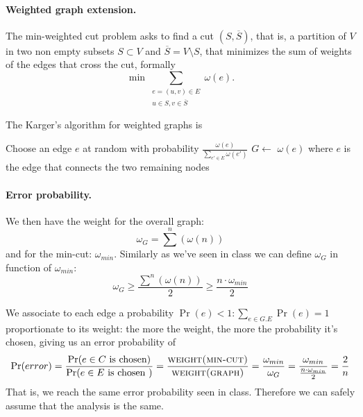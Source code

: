 \paragraph{Weighted graph extension.} The min-weighted cut problem asks to find a cut $(S, \overline{S})$, that is, a partition of $V$ in two non empty subsets $S \subset V$ and $\overline{S}=V \setminus S$, that minimizes the sum of weights of the edges that cross the cut, formally $$\min \sum_{\substack{e=(u,v)\in E \\ u \in S, v \in \overline{S}}} \omega(e).$$

The Karger's algorithm for weighted graphs is
\begin{algorithmic}[1]
	  \State Choose an edge $e$ at random with probability $\frac{\omega(e)}{\sum_{e' \in E} \omega(e')}$
	  \State $G \gets$ 
	\EndWhile
	\State \Return $\omega(e)$ where $e$ is the edge that connects the two remaining nodes
  \EndFunction
\end{algorithmic}

\paragraph{Error probability.} We then have the weight for the overall graph: 
\begin{equation*}
\omega_G = \sum^{n}\left( \omega(n) \right)
\end{equation*}
and for the min-cut: $\omega_{min}$.
Similarly as we've seen in class we can define $\omega_G$ in function of $\omega_{min}$:
\begin{equation*}
\omega_G \geq \frac{\sum^{n} \left( \omega(n) \right)}{2} \geq \frac{n \cdot \omega_{min}}{2}
\end{equation*}

We associate to each edge a probability $\Pr(e) < 1: \sum_{e \in G.E} \Pr(e)= 1$ proportionate to its weight: the more the weight, the more the probability it's chosen, giving us an error probability of
\begin{equation*}
\Pr(error) = \frac{\Pr(e \in C \text{ is chosen})}{\Pr(e \in E \text{ is chosen })} = \frac{\textsc{weight(min-cut)}}{\textsc{weight(graph)}} = \frac{\omega_{min}}{\omega_G} = \frac{\omega_{min}}{\frac{n \cdot \omega_{min}}{2}} = \frac{2}{n}
\end{equation*}
That is, we reach the same error probability seen in class.
Therefore we can safely assume that the analysis is the same.

